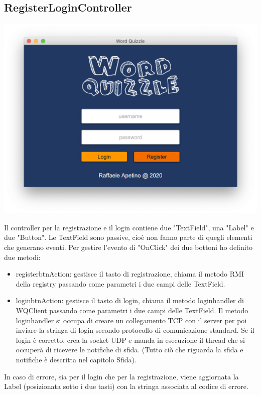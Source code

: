 \documentclass{article}
\begin{document}
\subsection{RegisterLoginController}
\begin{center}
\includegraphics[scale=0.5]{quizzleloginregister.png}
\end{center}
Il controller per la registrazione e il login contiene due "TextField", una "Label" e due "Button". Le TextField sono passive, cioè non fanno parte di quegli elementi che generano eventi. Per gestire l'evento di "OnClick" dei due bottoni ho definito due metodi:
\begin{itemize}
    \item registerbtnAction: gestisce il tasto di registrazione, chiama il metodo RMI della registry passando come parametri i due campi delle TextField.
    \item loginbtnAction: gestisce il tasto di login, chiama il metodo login\textunderscore handler di WQClient passando come parametri i due campi delle TextField. Il metodo login\textunderscore handler si occupa di creare un collegamento TCP con il server per poi inviare la stringa di login secondo protocollo di comunicazione standard. Se il login è corretto, crea la socket UDP e manda in esecuzione il thread che si occuperà di ricevere le notifiche di sfida. (Tutto ciò che riguarda la sfida e notifiche è descritta nel capitolo Sfida). 
\end{itemize}
In caso di errore, sia per il login che per la registrazione, viene aggiornata la Label (posizionata sotto i due tasti) con la stringa associata al codice di errore.
\end{document}
